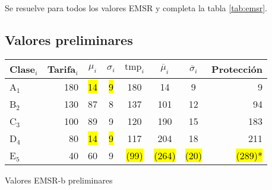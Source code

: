 \documentclass[12pt]{article}
\newcommand{\hlc}[2][yellow]{ {\sethlcolor{#1} \hl{#2}} }
\begin{document}
Se resuelve para todos los valores EMSR y completa la tabla \ref{tab:emsr}.






\subsection{Valores preliminares}


\begin{adjustwidth}{-2.5 cm}{-2.5 cm}\centering
\begin{threeparttable}[!htb]

\begin{tabular}{lrcccccr}\toprule
Clase$_i$ & Tarifa$_i$ & $\mu_i$ &$\sigma_i$ & $\text{tmp}_i$ & $\overline{\mu}_i$ & $\overline{\sigma}_i$ & Protección\\\midrule
A$_1$ & 180 & \hl{ 14 } &\hl{ 9 } & 180 & 14 & 9 & 9 \\
B$_2$ & 130 & 87 & 8 & 137 & 101 & 12 & 94 \\
C$_3$ & 100 & 89 & 9 & 120 & 190 & 15 & 183 \\
D$_4$ & 80 & \hl{ 14 } &\hl{ 9 } & 117 & 204 & 18 & 211 \\
E$_5$ & 40 & 60 &9 & \hlc[cyan]{ (99) }   & \hlc[cyan]{ (264) } & \hlc[cyan]{ (20) } & \hlc[cyan]{ (289)* }\\
\bottomrule
\end{tabular}

\caption{Valores EMSR-b preliminares}\label{tab:emsrpre}
\end{threeparttable}

\end{adjustwidth}
\end{document}
